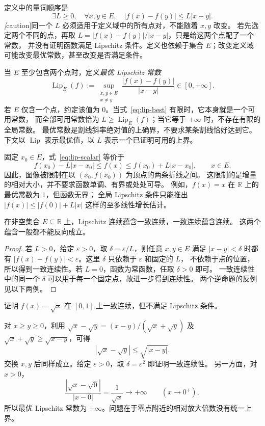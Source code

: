 \documentclass[UTF8,12pt,a4paper,fontset=fandol]{ctexart}
\begin{document}
定义中的量词顺序是
\[
  \exists L\ge0,\quad \forall x,y\in E,\quad |f(x)-f(y)|\le L|x-y|.
\]
\emph[caution]{同一个 $L$ 必须适用于定义域中的所有点对，不能随着 $x,y$ 改变。}
若先选定两个不同的点，再取 $L=|f(x)-f(y)|/|x-y|$，只是给这两个点配了一个常数，
并没有证明函数满足 Lipschitz 条件。定义也依赖于集合 $E$；改变定义域可能改变最优常数，甚至改变是否满足条件。

当 $E$ 至少包含两个点时，定义\emph{最优 Lipschitz 常数}
\begin{equation}\label{eq:lip-best}
  \operatorname{Lip}_E(f)
  :=\sup_{\substack{x,y\in E\\x\ne y}}
       \frac{|f(x)-f(y)|}{|x-y|}\in[0,+\infty].
\end{equation}
若 $E$ 仅含一个点，约定该值为 $0$。当式~\eqref{eq:lip-best} 有限时，它本身就是一个可用常数，
而全部可用常数恰为 $L\ge\operatorname{Lip}_E(f)$；当它等于 $+\infty$ 时，不存在有限的全局常数。
最优常数是割线斜率绝对值的上确界，不要求某条割线恰好达到它。
下文以 $\operatorname{Lip}$ 表示最优值，以 $L$ 表示一个已证明可用的上界。

固定 $x_0\in E$，式~\eqref{eq:lip-scalar} 等价于
\begin{equation}\label{eq:lip-cone}
  f(x_0)-L|x-x_0|\le f(x)\le f(x_0)+L|x-x_0|,
  \qquad x\in E.
\end{equation}
因此，图像被限制在以 $(x_0,f(x_0))$ 为顶点的两条折线之间。
这限制的是增量的相对大小，并不要求函数单调、有界或处处可导。
例如，$f(x)=x$ 在 $\mathbb R$ 上的最优常数为 $1$，但函数无界；
全局 Lipschitz 条件只能推出 $|f(x)|\le |f(0)|+L|x|$ 这样的至多线性增长估计。

\begin{proposition}\label{prop:lip-uniform}
在非空集合 $E\subseteq\mathbb R$ 上，Lipschitz 连续蕴含一致连续，一致连续蕴含连续。
这两个蕴含一般都不能反向成立。
\end{proposition}

\begin{proof}
若 $L>0$，给定 $\varepsilon>0$，取 $\delta=\varepsilon/L$，则任意 $x,y\in E$ 满足
$|x-y|<\delta$ 时都有 $|f(x)-f(y)|<\varepsilon$。这里 $\delta$ 只依赖于 $\varepsilon$ 和固定的 $L$，
不依赖于点的位置，所以得到一致连续性。若 $L=0$，函数为常函数，任取 $\delta>0$ 即可。
一致连续性中的同一个 $\delta$ 可以用于每一个固定点，故进一步得到连续性。
两个逆命题的反例见以下两例。
\end{proof}

\begin{example}\label{ex:lip-sqrt}
证明 $f(x)=\sqrt x$ 在 $[0,1]$ 上一致连续，但不满足 Lipschitz 条件。
\end{example}
\begin{solve}
对 $x\ge y\ge0$，利用
$\sqrt x-\sqrt y=(x-y)/(\sqrt x+\sqrt y)$ 及 $\sqrt x+\sqrt y\ge\sqrt{x-y}$，可得
\[
  |\sqrt x-\sqrt y|\le\sqrt{|x-y|}.
\]
交换 $x,y$ 后同样成立。给定 $\varepsilon>0$，取 $\delta=\varepsilon^2$ 即证明一致连续性。
另一方面，对 $x>0$，
\[
  \frac{|\sqrt x-\sqrt0|}{|x-0|}=\frac1{\sqrt x}\longrightarrow+\infty
  \qquad(x\to0^+),
\]
所以最优 Lipschitz 常数为 $+\infty$。问题在于零点附近的相对放大倍数没有统一上界。
\end{solve}
\end{document}
